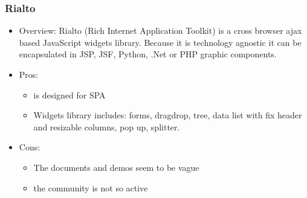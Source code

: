 \documentclass[14pt,a4paper]{extreport}
\begin{document}
			\subsubsection{Rialto}
			\begin{itemize}
				\item Overview: Rialto (Rich Internet Application Toolkit) is a cross browser ajax based JavaScript widgets library. Because it is technology agnostic it can be encapsulated in JSP, JSF, Python, .Net or PHP graphic components.
				\item Pros: 
					\begin{itemize}
						\item is designed for SPA
						\item Widgets library includes: forms, dragdrop, tree, data list with fix header and resizable columns, pop up, splitter.
					\end{itemize}
				\item Cons:
					\begin{itemize}
						\item The documents and demos seem to be vague 
						\item the community is not so active
					
					\end{itemize}
			\end{itemize}
			
\end{document}
